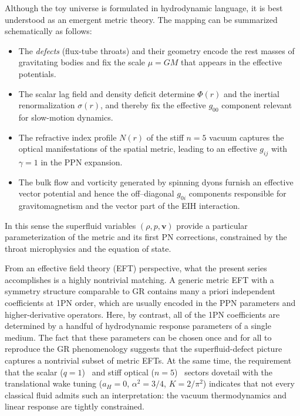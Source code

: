 \documentclass[11pt]{article}
\begin{document}
Although the toy universe is formulated in hydrodynamic language, it
is best understood as an emergent metric theory.
The mapping can be summarized schematically as follows:
\begin{itemize}
  \item The \emph{defects} (flux-tube throats) and their geometry
        encode the rest masses of gravitating bodies and fix the
        scale $\mu=GM$ that appears in the effective potentials.
  \item The scalar lag field and density deficit determine
        $\Phi(r)$ and the inertial renormalization $\sigma(r)$, and
        thereby fix the effective $g_{00}$ component relevant for
        slow-motion dynamics.
  \item The refractive index profile $N(r)$ of the stiff $n=5$
        vacuum captures the optical manifestations of the spatial
        metric, leading to an effective $g_{ij}$ with $\gamma=1$ in
        the PPN expansion.
  \item The bulk flow and vorticity generated by spinning dyons
        furnish an effective vector potential and hence the
        off–diagonal $g_{0i}$ components responsible for
        gravitomagnetism and the vector part of the EIH interaction.
\end{itemize}
In this sense the superfluid variables $(\rho,p,\mathbf{v})$ provide
a particular parameterization of the metric and its first PN
corrections, constrained by the throat microphysics and the equation
of state.

From an effective field theory (EFT) perspective, what the present
series accomplishes is a highly nontrivial matching.
A generic metric EFT with a symmetry structure comparable to GR
contains many a priori independent coefficients at 1PN order, which
are usually encoded in the PPN parameters and higher-derivative
operators.
Here, by contrast, all of the 1PN coefficients are determined by a
handful of hydrodynamic response parameters of a single medium.
The fact that these parameters can be chosen once and for all to
reproduce the GR phenomenology suggests that the superfluid-defect
picture captures a nontrivial subset of metric EFTs.
At the same time, the requirement that the scalar ($q=1$)~\cite{Norris:2025Orbits}
and stiff optical ($n=5$)~\cite{Norris:Paper2} sectors dovetail with the
translational wake tuning ($a_H=0$, $\alpha^2=3/4$, $K=2/\pi^2$) indicates that
not every classical fluid admits such an interpretation: the vacuum
thermodynamics and linear response are tightly constrained.
\end{document}
